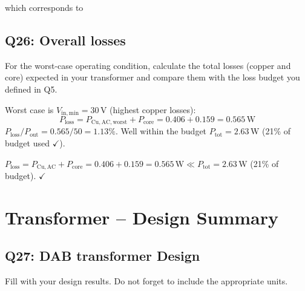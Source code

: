 \documentclass{PELsmallreport}
\begin{document}
 which corresponds to  \\  \hfill{}





\subsection{Q26: Overall losses} 
For the worst-case operating condition, calculate the total losses (copper and core) expected in your transformer and compare them with the loss budget you defined in Q5. 

\begin{framed}
Worst case is $V_\mathrm{in,min}=30\,\mathrm{V}$ (highest copper losses):
\begin{equation}
    P_\mathrm{loss} = P_\mathrm{Cu,AC,worst} + P_\mathrm{core} = 0.406 + 0.159 = 0.565\,\mathrm{W}
\end{equation}
$P_\mathrm{loss}/P_\mathrm{out} = 0.565/50 = 1.13\%$. Well within the budget $P_\mathrm{tot}=2.63\,\mathrm{W}$ (21\% of budget used $\checkmark$).
\end{framed}

  \hfill{}

\noindent $P_\mathrm{loss} = P_\mathrm{Cu,AC} + P_\mathrm{core} = 0.406 + 0.159 = 0.565\,\mathrm{W} \ll P_\mathrm{tot} = 2.63\,\mathrm{W}$ (21\% of budget). $\checkmark$








\newpage
\section{Transformer -- Design Summary}
\subsection{Q27: DAB transformer Design} 
Fill  with your design results. 
Do not forget to include the appropriate units.
\end{document}
